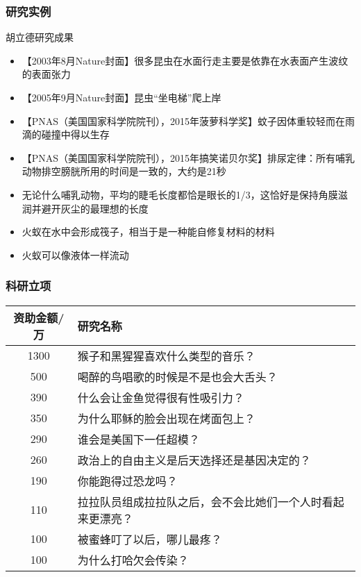 \begin{frame}
  \frametitle{研究实例}
  \begin{block}{胡立德研究成果}
    \begin{itemize}
      \item 【2003年8月Nature封面】很多昆虫在水面行走主要是依靠在水表面产生波纹的表面张力
      \item 【2005年9月Nature封面】昆虫“坐电梯”爬上岸
      \item 【PNAS（美国国家科学院院刊），2015年菠萝科学奖】蚊子因体重较轻而在雨滴的碰撞中得以生存
      \item 【PNAS（美国国家科学院院刊），2015年搞笑诺贝尔奖】排尿定律：所有哺乳动物排空膀胱所用的时间是一致的，大约是21秒
      \item 无论什么哺乳动物，平均的睫毛长度都恰是眼长的1/3，这恰好是保持角膜滋润并避开灰尘的最理想的长度
      \item 火蚁在水中会形成筏子，相当于是一种能自修复材料的材料
      \item 火蚁可以像液体一样流动
    \end{itemize}
  \end{block}
\end{frame}

\begin{frame}
  \frametitle{科研立项}
    \begin{table}
    \centering
    \begin{tabular}{cl}
      \hline
      \rowcolor{blue!50}资助金额/万 & 研究名称\\
      \hline
      1300 & 猴子和黑猩猩喜欢什么类型的音乐？\\
      500 & 喝醉的鸟唱歌的时候是不是也会大舌头？\\
      390 & 什么会让金鱼觉得很有性吸引力？\\
      350 & 为什么耶稣的脸会出现在烤面包上？\\
      290 & 谁会是美国下一任超模？\\
      260 & 政治上的自由主义是后天选择还是基因决定的？\\
      190 & 你能跑得过恐龙吗？\\
      110 & {\footnotesize 拉拉队员组成拉拉队之后，会不会比她们一个人时看起来更漂亮？}\\
      100 & 被蜜蜂叮了以后，哪儿最疼？\\
      100 & 为什么打哈欠会传染？\\
      \hline
    \end{tabular}
  \end{table}
\end{frame}

